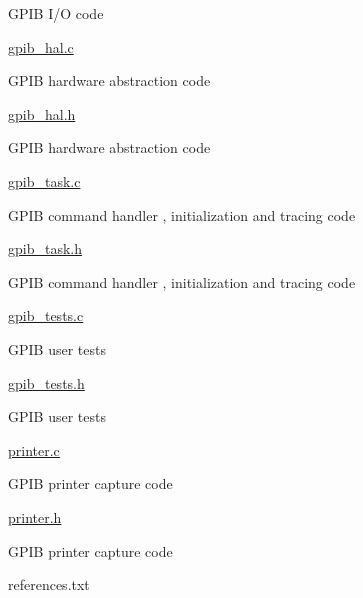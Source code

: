 \begin{DoxyItemize}
\begin{DoxyItemize}
\begin{DoxyItemize}
\item G\+P\+IB I/O code
\end{DoxyItemize}
\item \hyperlink{gpib__hal_8c}{gpib\+\_\+hal.\+c}
\begin{DoxyItemize}
\item G\+P\+IB hardware abstraction code
\end{DoxyItemize}
\item \hyperlink{gpib__hal_8h}{gpib\+\_\+hal.\+h}
\begin{DoxyItemize}
\item G\+P\+IB hardware abstraction code
\end{DoxyItemize}
\item \hyperlink{gpib__task_8c}{gpib\+\_\+task.\+c}
\begin{DoxyItemize}
\item G\+P\+IB command handler , initialization and tracing code
\end{DoxyItemize}
\item \hyperlink{gpib__task_8h}{gpib\+\_\+task.\+h}
\begin{DoxyItemize}
\item G\+P\+IB command handler , initialization and tracing code
\end{DoxyItemize}
\item \hyperlink{gpib__tests_8c}{gpib\+\_\+tests.\+c}
\begin{DoxyItemize}
\item G\+P\+IB user tests
\end{DoxyItemize}
\item \hyperlink{gpib__tests_8h}{gpib\+\_\+tests.\+h}
\begin{DoxyItemize}
\item G\+P\+IB user tests
\end{DoxyItemize}
\item \hyperlink{printer_8c}{printer.\+c}
\begin{DoxyItemize}
\item G\+P\+IB printer capture code
\end{DoxyItemize}
\item \hyperlink{printer_8h}{printer.\+h}
\begin{DoxyItemize}
\item G\+P\+IB printer capture code
\end{DoxyItemize}
\item references.\+txt
\begin{DoxyItemize}

\end{DoxyItemize}
\end{DoxyItemize}
\end{DoxyItemize}

